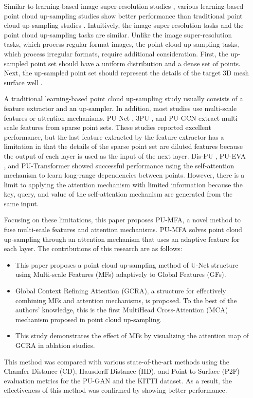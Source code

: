 \documentclass{article}
\begin{document}
\quad Similar to learning-based image super-resolution studies \cite{niu2020single,liang2021swinir}, various learning-based point cloud up-sampling studies \cite{qiu2021pu,luo2021pu,qian2021pu} show better performance than traditional point cloud up-sampling studies \cite{alexa2003computing,lipman2007parameterization}. Intuitively, the image super-resolution tasks and the point cloud up-sampling tasks are similar. Unlike the image super-resolution tasks, which process regular format images, the point cloud up-sampling tasks, which process irregular formats, require additional consideration. First, the up-sampled point set should have a uniform distribution and a dense set of points. Next, the up-sampled point set should represent the details of the target 3D mesh surface well \cite{li2019pu}.

\quad A traditional learning-based point cloud up-sampling study usually consists of a feature extractor and an up-sampler. In addition, most studies use multi-scale features or attention mechanisms. PU-Net \cite{yu2018pu}, 3PU \cite{yifan2019patch}, and PU-GCN \cite{qian2021pu} extract multi-scale features from sparse point sets. These studies reported excellent performance, but the last feature extracted by the feature extractor has a limitation in that the details of the sparse point set are diluted features because the output of each layer is used as the input of the next layer. Dis-PU \cite{li2021point}, PU-EVA \cite{luo2021pu}, and PU-Transformer \cite{qiu2021pu} showed successful performance using the self-attention mechanism to learn long-range dependencies between points. However, there is a limit to applying the attention mechanism with limited information because the key, query, and value of the self-attention mechanism are generated from the same input.

\quad Focusing on these limitations, this paper proposes PU-MFA, a novel method to fuse multi-scale features and attention mechanisms. PU-MFA solves point cloud up-sampling through an attention mechanism that uses an adaptive feature for each layer. The contributions of this research are as follows:
\begin{itemize}
    \item This paper proposes a point cloud up-sampling method of U-Net structure using Multi-scale Features (MFs) adaptively to Global Features (GFs).

    \item Global Context Refining Attention (GCRA), a structure for effectively combining MFs and attention mechanisms, is proposed. To the best of the authors’ knowledge, this is the first MultiHead Cross-Attention (MCA) mechanism proposed in point cloud up-sampling.
    
    \item This study demonstrates the effect of MFs by visualizing the attention map of GCRA in ablation studies.
\end{itemize}
This method was compared with various state-of-the-art methods using the Chamfer Distance (CD), Hausdorff Distance (HD), and Point-to-Surface (P2F) evaluation metrics for the PU-GAN \cite{li2019pu} and the KITTI \cite{geiger2013vision} dataset. As a result, the effectiveness of this method was confirmed by showing better performance.
\end{document}

